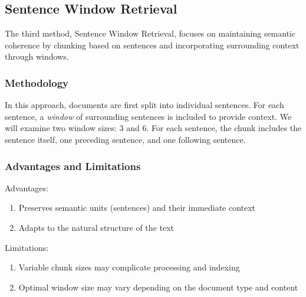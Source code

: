 \subsection{Sentence Window Retrieval}\label{subsec:sentence-window-retrieval}
The third method, Sentence Window Retrieval, focuses on maintaining semantic coherence by chunking based on sentences and incorporating surrounding context through windows.
\subsubsection{Methodology}
In this approach, documents are first split into individual sentences.
For each sentence, a \textit{window} of surrounding sentences is included to provide context.
We will examine two window sizes: 3 and 6.
For each sentence, the chunk includes the sentence itself, one preceding sentence, and one following sentence.

\subsubsection{Advantages and Limitations}
Advantages:
\begin{enumerate}
    \item Preserves semantic units (sentences) and their immediate context
    \item Adapts to the natural structure of the text
\end{enumerate}
Limitations:
\begin{enumerate}
    \item Variable chunk sizes may complicate processing and indexing
    \item Optimal window size may vary depending on the document type and content
\end{enumerate}
